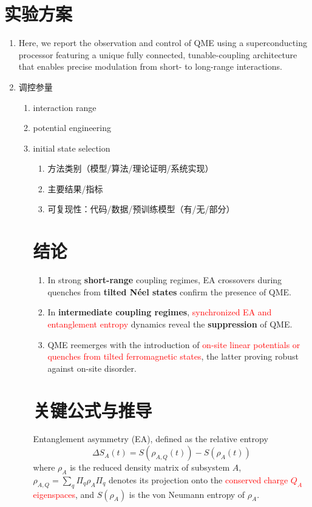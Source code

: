 \documentclass[11pt,a4paper]{article}
\begin{document}
\section{实验方案}
\begin{enumerate}
    \item Here, we report the observation and control of QME using a superconducting processor featuring a unique fully connected, tunable-coupling architecture that enables precise modulation from short- to long-range interactions.
    \item 调控参量
        \begin{enumerate}
            \item interaction range
            \item potential engineering 
            \item initial state selection
        \begin{enumerate}
    \item 方法类别（模型/算法/理论证明/系统实现）
    \item 主要结果/指标
    \item 可复现性：代码/数据/预训练模型（有/无/部分）
\end{enumerate}


\section{结论}
\begin{enumerate}
    \item In strong \textbf{short-range} coupling regimes, EA crossovers during quenches from \textbf{tilted Néel states} confirm the presence of QME.
    \item In \textbf{intermediate coupling regimes}, \textcolor{red}{synchronized EA and entanglement entropy} dynamics reveal the \textbf{suppression} of QME.
    \item QME reemerges with the introduction of \textcolor{red}{on-site linear potentials or quenches from tilted ferromagnetic states}, the latter proving robust against on-site disorder.
\end{enumerate}


\section{关键公式与推导}
Entanglement asymmetry (EA), defined as the relative entropy
\begin{equation}
\Delta S_A(t)=S\left(\rho_{A, Q}(t)\right)-S\left(\rho_A(t)\right)
\end{equation}
where $\rho_A$ is the reduced density matrix of subsystem $A$, $\rho_{A, Q}=\sum_q \Pi_q \rho_A \Pi_q$ denotes its projection onto the \textcolor{red}{conserved charge $Q_A$ eigenspaces}, and $S\left(\rho_A\right)$ is the von Neumann entropy of $\rho_A$. 


\end{enumerate}
\end{enumerate}
\end{document}
